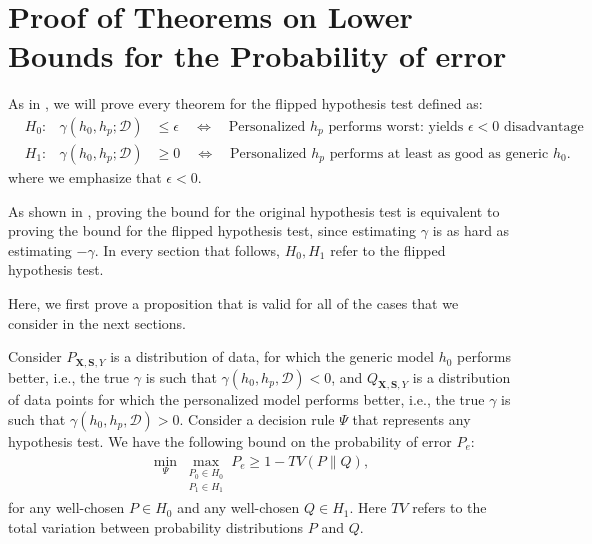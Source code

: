 
\section{Proof of Theorems on Lower Bounds for the Probability of error}


As in \citep{monteiro2022epistemic}, we will prove every theorem for the flipped hypothesis test defined as:
\begin{align*}
& H_0: 
&\gamma(h_0, h_p; \mathcal{D})
&\leq \epsilon \quad 
\Leftrightarrow \quad 
\text{Personalized $h_p$ performs worst: yields $\epsilon <0$ disadvantage} \\
& H_1: 
&\gamma(h_0, h_p; \mathcal{D}) 
&\geq 0 \quad 
\Leftrightarrow \quad 
\text{Personalized $h_p$ performs at least as good as generic $h_0$.}
\end{align*}
where we emphasize that $\epsilon < 0$.

As shown in \citep{monteiro2022epistemic}, proving the bound for the original hypothesis test is equivalent to proving the bound for the flipped hypothesis test, since estimating $\gamma$ is as hard as estimating $-\gamma$. In every section that follows, $H_0, H_1$ refer to the flipped hypothesis test.

Here, we first prove a proposition that is valid for all of the cases that we consider in the next sections.

\begin{proposition}\label{prop:lower_bound}
    Consider $P_{\mathbf{X}, \mathbf{S}, Y}$ is a distribution of data, for which the generic model $h_0$ performs better, i.e., the true $\gamma$ is such that $\gamma(h_0, h_p, \mathcal{D}) < 0$, and $Q_{\mathbf{X}, \mathbf{S}, Y}$ is a distribution of data points for which the personalized model performs better, i.e., the true $\gamma$ is such that $\gamma(h_0, h_p, \mathcal{D}) > 0$. Consider a decision rule $\Psi$ that represents any hypothesis test.
    We have the following bound on the probability of error $P_e$:
    \begin{align*}
    \min _{\Psi} 
    \max _{\substack{P_0 \in H_0 \\ P_1 \in H_1}}
        P_e 
        \geq 
        1 - TV(P\parallel Q),
    \end{align*}
for any well-chosen $P \in H_0$ and any well-chosen $Q \in H_1$. Here $TV$ refers to the total variation between probability distributions $P$ and $Q$.
\end{proposition}

